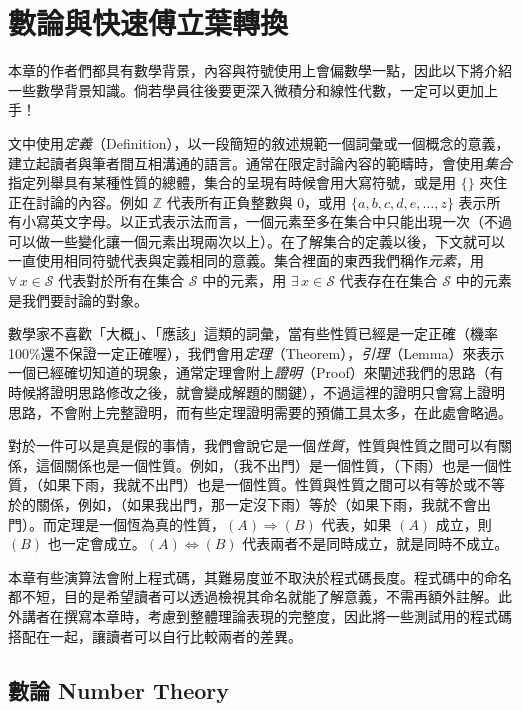 
\chapter{數論與快速傅立葉轉換}
\label{sec:intro}

本章的作者們都具有數學背景，內容與符號使用上會偏數學一點，因此以下將介紹一些數學背景知識。倘若學員往後要更深入微積分和線性代數，一定可以更加上手！

文中使用\emph{定義}（Definition），以一段簡短的敘述規範一個詞彙或一個概念的意義，建立起讀者與筆者間互相溝通的語言。通常在限定討論內容的範疇時，會使用\emph{集合}指定列舉具有某種性質的總體，集合的呈現有時候會用大寫符號，或是用 $\{\}$ 夾住正在討論的內容。例如 $\mathbb{Z}$ 代表所有正負整數與 $0$，或用 $\{a,b,c,d,e,\ldots,z\}$ 表示所有小寫英文字母。以正式表示法而言，一個元素至多在集合中只能出現一次（不過可以做一些變化讓一個元素出現兩次以上）。在了解集合的定義以後，下文就可以一直使用相同符號代表與定義相同的意義。集合裡面的東西我們稱作\emph{元素}，用 $\forall\,x\in\mathcal{S}$ 代表對於所有在集合 $\mathcal{S}$ 中的元素，用 $\exists\,x \in\mathcal{S}$ 代表存在在集合 $\mathcal{S}$ 中的元素是我們要討論的對象。

數學家不喜歡「大概」、「應該」這類的詞彙，當有些性質已經是一定正確（機率 100\%還不保證一定正確喔），我們會用\emph{定理}（Theorem），\emph{引理}（Lemma）來表示一個已經確切知道的現象，通常定理會附上\emph{證明}（Proof）來闡述我們的思路（有時候將證明思路修改之後，就會變成解題的關鍵），不過這裡的證明只會寫上證明思路，不會附上完整證明，而有些定理證明需要的預備工具太多，在此處會略過。

對於一件可以是真是假的事情，我們會說它是一個\emph{性質}，性質與性質之間可以有關係，這個關係也是一個性質。例如，（我不出門）是一個性質，（下雨）也是一個性質，（如果下雨，我就不出門）也是一個性質。性質與性質之間可以有等於或不等於的關係，例如，（如果我出門，那一定沒下雨）等於（如果下雨，我就不會出門）。而定理是一個恆為真的性質，$(A)\Rightarrow(B)$ 代表，如果 $(A)$ 成立，則 $(B)$ 也一定會成立。$(A)\Leftrightarrow(B)$ 代表兩者不是同時成立，就是同時不成立。

本章有些演算法會附上程式碼，其難易度並不取決於程式碼長度。程式碼中的命名都不短，目的是希望讀者可以透過檢視其命名就能了解意義，不需再額外註解。此外講者在撰寫本章時，考慮到整體理論表現的完整度，因此將一些測試用的程式碼搭配在一起，讓讀者可以自行比較兩者的差異。


\section{數論 Number Theory}
\label{sec:div}

